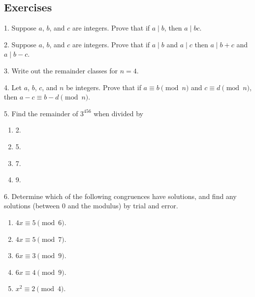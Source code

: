 \documentclass[10pt,]{book}
\theoremstyle{plain}
\theoremstyle{definition}
\theoremstyle{definition}
\theoremstyle{definition}
\numberwithin{equation}{chapter}
\begin{document}
\subsection[Exercises]{Exercises}\label{exercises-32}
\begin{exerciselist}
\item[1.]\hypertarget{exercise-338}{}
Suppose \(a\), \(b\), and \(c\) are integers. Prove that if \(a \mid b\), then \(a \mid bc\).
%
\par\smallskip
\item[2.]\hypertarget{exercise-339}{}
Suppose \(a\), \(b\), and \(c\) are integers. Prove that if \(a \mid b\) and \(a \mid c\) then \(a \mid b+c\) and \(a \mid b-c\).
%
\par\smallskip
\item[3.]\hypertarget{exercise-340}{}
Write out the remainder classes for \(n = 4\).
%
\par\smallskip
\item[4.]\hypertarget{exercise-341}{}
Let \(a\), \(b\), \(c\), and \(n\) be integers. Prove that if \(a \equiv b \pmod{n}\) and \(c \equiv d \pmod{n}\), then \(a-c \equiv b-d \pmod{n}\).
%
\par\smallskip
\item[5.]\hypertarget{exercise-342}{}
Find the remainder of \(3^{456}\) when divided by
%
\leavevmode%
\begin{enumerate}[label=(\alph*)]
\item\hypertarget{li-1409}{}
2.
%
\item\hypertarget{li-1410}{}
5.
%
\item\hypertarget{li-1411}{}
7.
%
\item\hypertarget{li-1412}{}
9.
%
\end{enumerate}
\par\smallskip
\item[6.]\hypertarget{exercise-343}{}
Determine which of the following congruences have solutions, and find any solutions (between 0 and the modulus) by trial and error.
%
\leavevmode%
\begin{enumerate}[label=(\alph*)]
\item\hypertarget{li-1417}{}\(4x \equiv 5 \pmod 6\).%
\item\hypertarget{li-1418}{}\(4x \equiv 5 \pmod 7\).%
\item\hypertarget{li-1419}{}\(6x \equiv 3 \pmod 9\).%
\item\hypertarget{li-1420}{}\(6x \equiv 4 \pmod 9\).%
\item\hypertarget{li-1421}{}\(x^2 \equiv 2 \pmod 4\).%

\end{enumerate}
\end{exerciselist}
\end{document}
